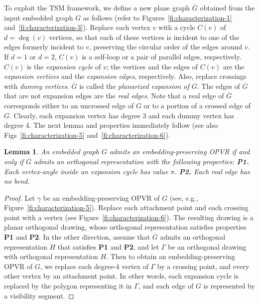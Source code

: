 \documentclass{article}
\newtheorem{lemma}{Lemma}
\newcommand{\p}{\pi}
\newcommand{\opvr}{OPVR\xspace}
\newcommand{\bG}{\overline{G}}
\begin{document}
\smallskip {} To exploit the TSM framework, we define a new plane graph $\bG$ obtained from the input embedded graph $G$ as follows (refer to Figures~\ref{fi:characterization-1} and~\ref{fi:characterization-3}). Replace each vertex $v$ with a cycle $C(v)$ of $d=\deg(v)$ vertices, so that each of these vertices is incident to one of the edges formerly incident to $v$, preserving the circular order of the edges around $v$. If $d=1$ or $d=2$, $C(v)$ is a self-loop or a pair of parallel edges, respectively. $C(v)$ is the \emph{expansion cycle} of $v$; the vertices and the edges of $C(v)$ are the \emph{expansion vertices} and the \emph{expansion edges}, respectively. Also, replace crossings with \emph{dummy vertices}. $\bG$ is called the \emph{planarized expansion of $G$}. The edges of $\bG$ that are not expansion edges are the \emph{real edges}. Note that a real edge of $\bG$ corresponds either to an  uncrossed edge of $G$ or to a portion of a crossed edge of $G$. Clearly, each expansion vertex has degree 3 and each dummy vertex has degree 4.  The next lemma and properties immediately follow (see also Figs~\ref{fi:characterization-5} and~\ref{fi:characterization-6}).

\begin{lemma}\label{le:opvr-od}
An embedded graph $G$ admits an embedding-preserving \opvr if and only if $\bG$ admits an orthogonal representation with the following properties: {\bf P1.} Each vertex-angle inside an expansion cycle has value $\p$. {\bf P2.} Each real edge has no bend.
\end{lemma}
\begin{proof}
Let $\gamma$ be an embedding-preserving \opvr of $G$ (see, e.g., Figure~\ref{fi:characterization-5}). Replace each attachment point and each crossing point with a vertex (see Figure~\ref{fi:characterization-6}). The resulting drawing is a planar orthogonal drawing, whose orthogonal representation satisfies properties {\bf P1} and {\bf P2}.
In the other direction, assume that $\bG$ admits an orthogonal representation $H$ that satisfies {\bf P1} and {\bf P2}, and let $\Gamma$ be an orthogonal drawing with orthogonal representation $H$. Then to obtain an embedding-preserving \opvr of $G$, we replace each degree-4 vertex of $\Gamma$ by a crossing point, and every other vertex by an attachment point. In other words, each expansion cycle is replaced by the polygon representing it in $\Gamma$, and each edge of $G$ is represented by a visibility segment.
\end{proof}
\end{document}
